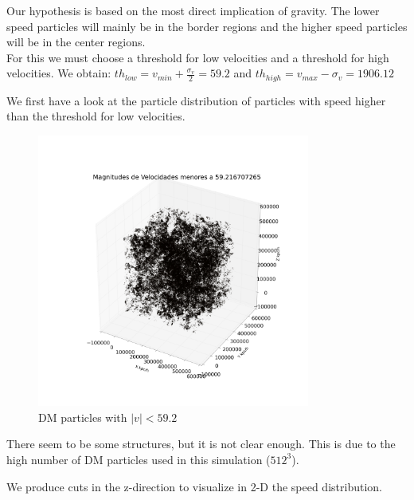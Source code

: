 \documentclass[12pt]{article}
\begin{document}
Our hypothesis is based on the most direct implication of gravity. The lower speed
particles will mainly be in the border regions and the higher speed particles
will be in the center regions. \\

For this we must choose a threshold for low velocities and a threshold for high velocities. 
We obtain: $th_{low} = v_{min} + \frac{\sigma_{v}}{2} = 59.2$ and $th_{high} = v_{max}  - \sigma_{v} = 1906.12 $

We first have a look at the particle distribution of particles with speed higher than the
threshold for low velocities.\\
\begin{figure}[ht]
\begin{center}
\includegraphics[width=0.8\textwidth]{graphs/pos_3d_vel_menor_s_smaller.png} %
\caption{DM particles with $|v| < 59.2 $}
\label{fg:3d_thresh_low}
\end{center}
\end{figure}
\FloatBarrier

There seem to be some structures, but it is not clear enough. This is due to the high number of DM particles used in this simulation ($512^3$). 


We produce cuts in the z-direction to visualize in 2-D the speed distribution. \\
\end{document}
